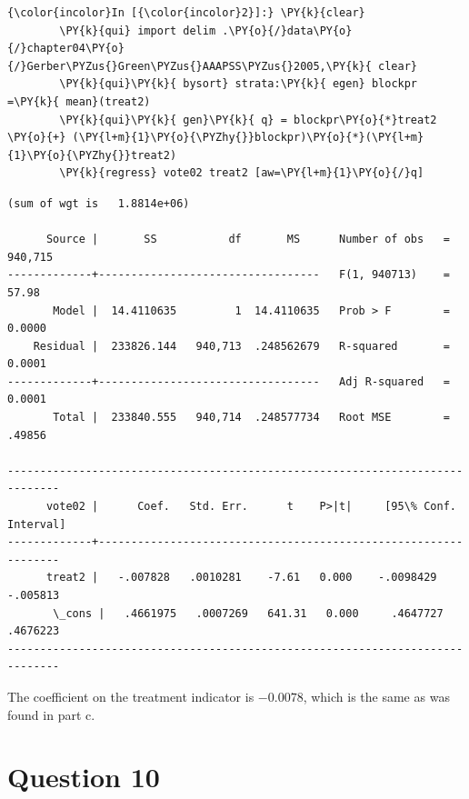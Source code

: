 \documentclass[11pt,notitlepage]{article}\usepackage[]{graphicx}\usepackage[]{color}
\makeatletter
\newenvironment{kframe}{%
 \def\at@end@of@kframe{}%
 \ifinner\ifhmode%
  \def\at@end@of@kframe{\end{minipage}}%
  \begin{minipage}{\columnwidth}%
 \fi\fi%
 \def\FrameCommand##1{\hskip\@totalleftmargin \hskip-\fboxsep
 \colorbox{shadecolor}{##1}\hskip-\fboxsep
     \hskip-\linewidth \hskip-\@totalleftmargin \hskip\columnwidth}%
 \MakeFramed {\advance\hsize-\width
   \@totalleftmargin\z@ \linewidth\hsize
   \@setminipage}}%
 {\par\unskip\endMakeFramed%
 \at@end@of@kframe}
\newenvironment{knitrout}{}{} %
\makeatother
\begin{document}
\begin{enumerate}[a)]
\begin{knitrout}
\color{fgcolor}\begin{kframe}
    \begin{Verbatim}[commandchars=\\\{\}]
{\color{incolor}In [{\color{incolor}2}]:} \PY{k}{clear}
        \PY{k}{qui} import delim .\PY{o}{/}data\PY{o}{/}chapter04\PY{o}{/}Gerber\PYZus{}Green\PYZus{}AAAPSS\PYZus{}2005,\PY{k}{ clear}
        \PY{k}{qui}\PY{k}{ bysort} strata:\PY{k}{ egen} blockpr =\PY{k}{ mean}(treat2)
        \PY{k}{qui}\PY{k}{ gen}\PY{k}{ q} = blockpr\PY{o}{*}treat2 \PY{o}{+} (\PY{l+m}{1}\PY{o}{\PYZhy{}}blockpr)\PY{o}{*}(\PY{l+m}{1}\PY{o}{\PYZhy{}}treat2)
        \PY{k}{regress} vote02 treat2 [aw=\PY{l+m}{1}\PY{o}{/}q]
\end{Verbatim}

    \begin{Verbatim}[commandchars=\\\{\}]
(sum of wgt is   1.8814e+06)

      Source |       SS           df       MS      Number of obs   =   940,715
-------------+----------------------------------   F(1, 940713)    =     57.98
       Model |  14.4110635         1  14.4110635   Prob > F        =    0.0000
    Residual |  233826.144   940,713  .248562679   R-squared       =    0.0001
-------------+----------------------------------   Adj R-squared   =    0.0001
       Total |  233840.555   940,714  .248577734   Root MSE        =    .49856

------------------------------------------------------------------------------
      vote02 |      Coef.   Std. Err.      t    P>|t|     [95\% Conf. Interval]
-------------+----------------------------------------------------------------
      treat2 |   -.007828   .0010281    -7.61   0.000    -.0098429    -.005813
       \_cons |   .4661975   .0007269   641.31   0.000     .4647727    .4676223
------------------------------------------------------------------------------

    \end{Verbatim}
\end{kframe}
\end{knitrout}

The coefficient on the treatment indicator is \ensuremath{-0.0078}, which is the same as was found in part c.

\end{enumerate}


\section*{Question 10}
\end{document}
